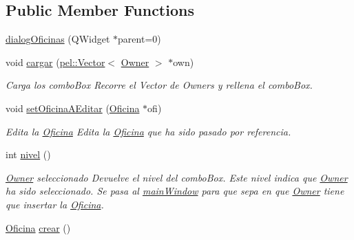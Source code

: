 \subsection*{Public Member Functions}
\begin{DoxyCompactItemize}
\item 
\hyperlink{classdialogOficinas_a38eadc87eb5381d6447af6b54d73bf53}{dialog\+Oficinas} (Q\+Widget $\ast$parent=0)
\item 
\hypertarget{classdialogOficinas_a0c288a8d061c6166813655108f58201f}{}void \hyperlink{classdialogOficinas_a0c288a8d061c6166813655108f58201f}{cargar} (\hyperlink{classpel_1_1Vector}{pel\+::\+Vector}$<$ \hyperlink{classOwner}{Owner} $>$ $\ast$own)\label{classdialogOficinas_a0c288a8d061c6166813655108f58201f}

\begin{DoxyCompactList}\small\item\em Carga los combo\+Box Recorre el Vector de Owners y rellena el combo\+Box. \end{DoxyCompactList}\item 
\hypertarget{classdialogOficinas_acc1a0e8268c26201cb9370cd5d6fcbf7}{}void \hyperlink{classdialogOficinas_acc1a0e8268c26201cb9370cd5d6fcbf7}{set\+Oficina\+A\+Editar} (\hyperlink{classOficina}{Oficina} $\ast$ofi)\label{classdialogOficinas_acc1a0e8268c26201cb9370cd5d6fcbf7}

\begin{DoxyCompactList}\small\item\em Edita la \hyperlink{classOficina}{Oficina} Edita la \hyperlink{classOficina}{Oficina} que ha sido pasado por referencia. \end{DoxyCompactList}\item 
\hypertarget{classdialogOficinas_a46996aad61f5441f20c94012a864d277}{}int \hyperlink{classdialogOficinas_a46996aad61f5441f20c94012a864d277}{nivel} ()\label{classdialogOficinas_a46996aad61f5441f20c94012a864d277}

\begin{DoxyCompactList}\small\item\em \hyperlink{classOwner}{Owner} seleccionado Devuelve el nivel del combo\+Box. Este nivel indica que \hyperlink{classOwner}{Owner} ha sido seleccionado. Se pasa al \hyperlink{classmainWindow}{main\+Window} para que sepa en que \hyperlink{classOwner}{Owner} tiene que insertar la \hyperlink{classOficina}{Oficina}. \end{DoxyCompactList}\item 
\hypertarget{classdialogOficinas_af32d29c6889afddbcd1a89543fccf666}{}\hyperlink{classOficina}{Oficina} \hyperlink{classdialogOficinas_af32d29c6889afddbcd1a89543fccf666}{crear} ()\label{classdialogOficinas_af32d29c6889afddbcd1a89543fccf666}


\end{DoxyCompactItemize}
